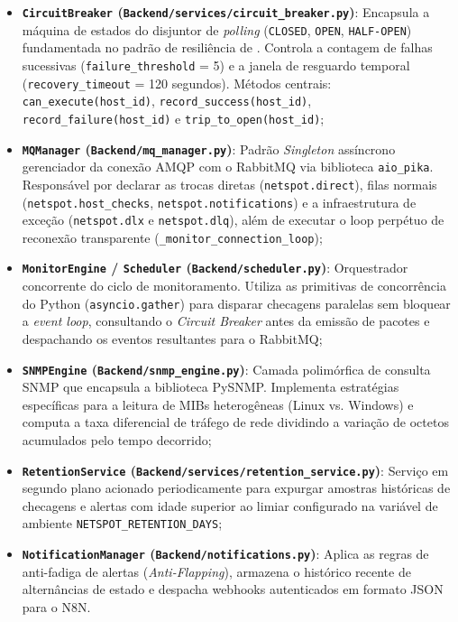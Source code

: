 \documentclass[12pt,a4paper]{article}
\begin{document}
\begin{itemize}[leftmargin=1.25cm]
\item \textbf{\texttt{CircuitBreaker} (\texttt{Backend/services/circuit\_breaker.py})}: Encapsula a máquina de estados do disjuntor de \textit{polling} (\texttt{CLOSED}, \texttt{OPEN}, \texttt{HALF-OPEN}) fundamentada no padrão de resiliência de . Controla a contagem de falhas sucessivas (\texttt{failure\_threshold} = 5) e a janela de resguardo temporal (\texttt{recovery\_timeout} = 120 segundos). Métodos centrais: \texttt{can\_execute(host\_id)}, \texttt{record\_success(host\_id)}, \texttt{record\_failure(host\_id)} e \texttt{trip\_to\_open(host\_id)};
\item \textbf{\texttt{MQManager} (\texttt{Backend/mq\_manager.py})}: Padrão \textit{Singleton} assíncrono gerenciador da conexão AMQP com o RabbitMQ via biblioteca \texttt{aio\_pika}. Responsável por declarar as trocas diretas (\texttt{netspot.direct}), filas normais (\texttt{netspot.host\_checks}, \texttt{netspot.notifications}) e a infraestrutura de exceção (\texttt{netspot.dlx} e \texttt{netspot.dlq}), além de executar o loop perpétuo de reconexão transparente (\texttt{\_monitor\_connection\_loop});
\item \textbf{\texttt{MonitorEngine} / \texttt{Scheduler} (\texttt{Backend/scheduler.py})}: Orquestrador concorrente do ciclo de monitoramento. Utiliza as primitivas de concorrência do Python (\texttt{asyncio.gather}) para disparar checagens paralelas sem bloquear a \textit{event loop}, consultando o \textit{Circuit Breaker} antes da emissão de pacotes e despachando os eventos resultantes para o RabbitMQ;
\item \textbf{\texttt{SNMPEngine} (\texttt{Backend/snmp\_engine.py})}: Camada polimórfica de consulta SNMP que encapsula a biblioteca PySNMP. Implementa estratégias específicas para a leitura de MIBs heterogêneas (Linux vs. Windows) e computa a taxa diferencial de tráfego de rede dividindo a variação de octetos acumulados pelo tempo decorrido;
\item \textbf{\texttt{RetentionService} (\texttt{Backend/services/retention\_service.py})}: Serviço em segundo plano acionado periodicamente para expurgar amostras históricas de checagens e alertas com idade superior ao limiar configurado na variável de ambiente \texttt{NETSPOT\_RETENTION\_DAYS};
\item \textbf{\texttt{NotificationManager} (\texttt{Backend/notifications.py})}: Aplica as regras de anti-fadiga de alertas (\textit{Anti-Flapping}), armazena o histórico recente de alternâncias de estado e despacha webhooks autenticados em formato JSON para o N8N.
\end{itemize}
\end{document}
